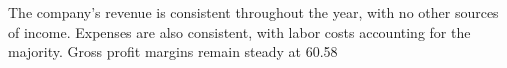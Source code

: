 

The company's revenue is consistent throughout the year, with no other sources of income. Expenses are also consistent, with labor costs accounting for the majority. Gross profit margins remain steady at 60.58%
